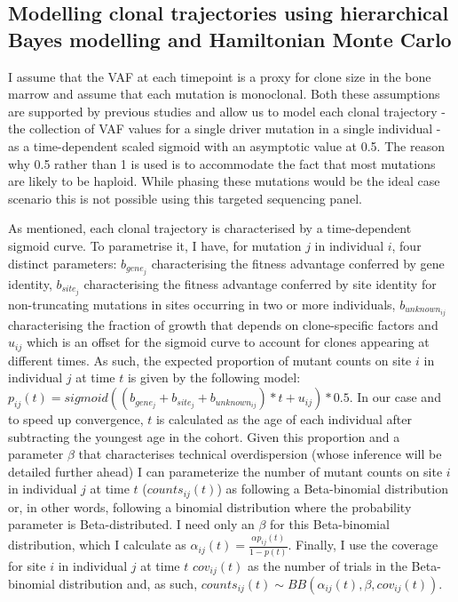 \subsection{Modelling clonal trajectories using hierarchical Bayes modelling and Hamiltonian Monte Carlo}

I assume that the VAF at each timepoint is a proxy for clone size in the bone marrow and assume that each mutation is monoclonal. Both these assumptions are supported by previous studies \cite{Miles2020-fz,Lee2020-yp,Hwang2018-tp} and allow us to model each clonal trajectory - the collection of VAF values for a single driver mutation in a single individual - as a time-dependent scaled sigmoid with an asymptotic value at 0.5. The reason why 0.5 rather than 1 is used is to accommodate the fact that most mutations are likely to be haploid. While phasing these mutations would be the ideal case scenario this is not possible using this targeted sequencing panel.

As mentioned, each clonal trajectory is characterised by a time-dependent sigmoid curve. To parametrise it, I have, for mutation $j$ in individual $i$, four distinct parameters: $b_{gene_j}$ characterising the fitness advantage conferred by gene identity, $b_{site_j}$ characterising the fitness advantage conferred by site identity for non-truncating mutations in sites occurring in two or more individuals, $b_{unknown_{ij}}$ characterising the fraction of growth that depends on clone-specific factors and $u_{ij}$ which is an offset for the sigmoid curve to account for clones appearing at different times. As such, the expected proportion of mutant counts on site $i$ in individual $j$ at time $t$ is given by the following model: $p_{ij}(t)=sigmoid((b_{gene_j}+b_{site_j}+b_{unknown_{ij}})*t + u_{ij})*0.5$. In our case and to speed up convergence, $t$ is calculated as the age of each individual after subtracting the youngest age in the cohort. Given this proportion and a parameter $\beta$ that characterises technical overdispersion (whose inference will be detailed further ahead) I can parameterize the number of mutant counts on site $i$ in individual $j$ at time $t$ ($counts_{ij}(t)$) as following a Beta-binomial distribution or, in other words, following a binomial distribution where the probability parameter is Beta-distributed. I need only an $\beta$ for this Beta-binomial distribution, which I calculate as $\alpha_{ij}(t)=\frac{\alpha p_{ij}(t)}{1-p(t)}$. Finally, I use the coverage for site $i$ in individual $j$ at time $t$ $cov_{ij}(t)$ as the number of trials in the Beta-binomial distribution and, as such, $counts_{ij}(t) \sim BB(\alpha_{ij}(t),\beta,cov_{ij}(t))$.

